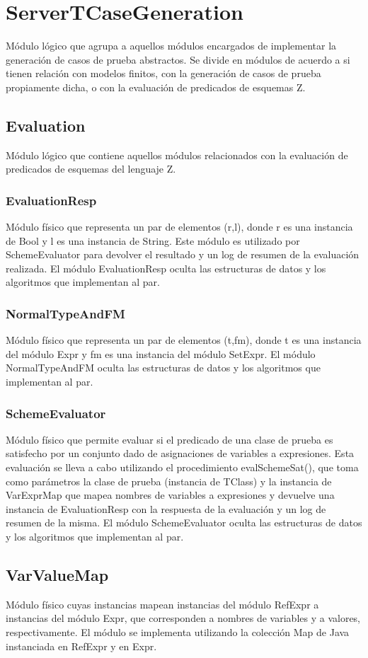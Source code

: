 \documentclass[a4paper,10pt]{report}
\begin{document}
	\section{ServerTCaseGeneration}
	Módulo lógico que agrupa a aquellos módulos encargados de implementar la generación de casos de prueba abstractos. Se divide en módulos de acuerdo a si tienen relación con modelos finitos, con la generación de casos de prueba propiamente dicha, o con la evaluación de predicados de esquemas Z.
		\subsection{Evaluation}
		Módulo lógico que contiene aquellos módulos relacionados con la evaluación de predicados de esquemas del lenguaje Z.
			\subsubsection{EvaluationResp}
			Módulo físico que representa un par de elementos (r,l), donde r es una instancia de Bool y l es una instancia de String. Este módulo es utilizado por SchemeEvaluator para devolver el resultado y un log de resumen de la evaluación realizada. El módulo EvaluationResp oculta las estructuras de datos y los algoritmos que implementan al par.
			\subsubsection{NormalTypeAndFM}
			Módulo físico que representa un par de elementos (t,fm), donde t es una instancia del módulo Expr y fm es una instancia del módulo SetExpr. El módulo NormalTypeAndFM oculta las estructuras de datos y los algoritmos que implementan al par.
			\subsubsection{SchemeEvaluator}
			Módulo físico que permite evaluar si el predicado de una clase de prueba es satisfecho por un conjunto dado de asignaciones de variables a expresiones. Esta evaluación se lleva a cabo utilizando el procedimiento evalSchemeSat(), que toma como parámetros la clase de prueba (instancia de TClass) y la instancia de VarExprMap que mapea nombres de variables a expresiones y devuelve una instancia de EvaluationResp con la respuesta de la evaluación y un log de resumen de la misma. El módulo SchemeEvaluator oculta las estructuras de datos y los algoritmos que implementan al par.
			\subsection{VarValueMap}
			Módulo físico cuyas instancias mapean instancias del módulo RefExpr a instancias del módulo Expr, que corresponden a nombres de variables y a valores, respectivamente. El módulo se implementa utilizando la colección Map de Java instanciada en RefExpr y en Expr.
\end{document}
